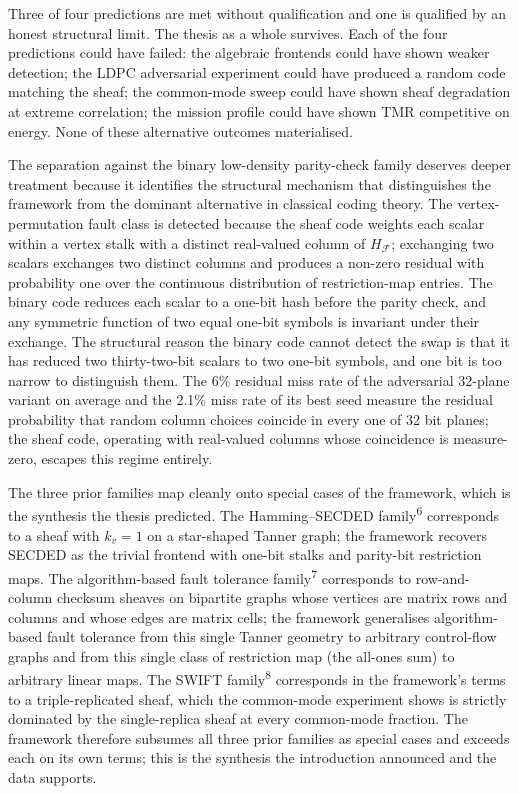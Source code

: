 \documentclass[12pt,a4paper]{article}
\theoremstyle{plain}
\theoremstyle{definition}
\begin{document}
Three of four predictions are met without qualification and one is qualified by an honest structural limit. The thesis as a whole survives. Each of the four predictions could have failed: the algebraic frontends could have shown weaker detection; the LDPC adversarial experiment could have produced a random code matching the sheaf; the common-mode sweep could have shown sheaf degradation at extreme correlation; the mission profile could have shown TMR competitive on energy. None of these alternative outcomes materialised.

The separation against the binary low-density parity-check family deserves deeper treatment because it identifies the structural mechanism that distinguishes the framework from the dominant alternative in classical coding theory. The vertex-permutation fault class is detected because the sheaf code weights each scalar within a vertex stalk with a distinct real-valued column of $H_\mathcal{F}$; exchanging two scalars exchanges two distinct columns and produces a non-zero residual with probability one over the continuous distribution of restriction-map entries. The binary code reduces each scalar to a one-bit hash before the parity check, and any symmetric function of two equal one-bit symbols is invariant under their exchange. The structural reason the binary code cannot detect the swap is that it has reduced two thirty-two-bit scalars to two one-bit symbols, and one bit is too narrow to distinguish them. The 6\% residual miss rate of the adversarial 32-plane variant on average and the 2.1\% miss rate of its best seed measure the residual probability that random column choices coincide in every one of 32 bit planes; the sheaf code, operating with real-valued columns whose coincidence is measure-zero, escapes this regime entirely.

The three prior families map cleanly onto special cases of the framework, which is the synthesis the thesis predicted. The Hamming--SECDED family\textsuperscript{6} corresponds to a sheaf with $k_v = 1$ on a star-shaped Tanner graph; the framework recovers SECDED as the trivial frontend with one-bit stalks and parity-bit restriction maps. The algorithm-based fault tolerance family\textsuperscript{7} corresponds to row-and-column checksum sheaves on bipartite graphs whose vertices are matrix rows and columns and whose edges are matrix cells; the framework generalises algorithm-based fault tolerance from this single Tanner geometry to arbitrary control-flow graphs and from this single class of restriction map (the all-ones sum) to arbitrary linear maps. The SWIFT family\textsuperscript{8} corresponds in the framework's terms to a triple-replicated sheaf, which the common-mode experiment shows is strictly dominated by the single-replica sheaf at every common-mode fraction. The framework therefore subsumes all three prior families as special cases and exceeds each on its own terms; this is the synthesis the introduction announced and the data supports.
\end{document}

